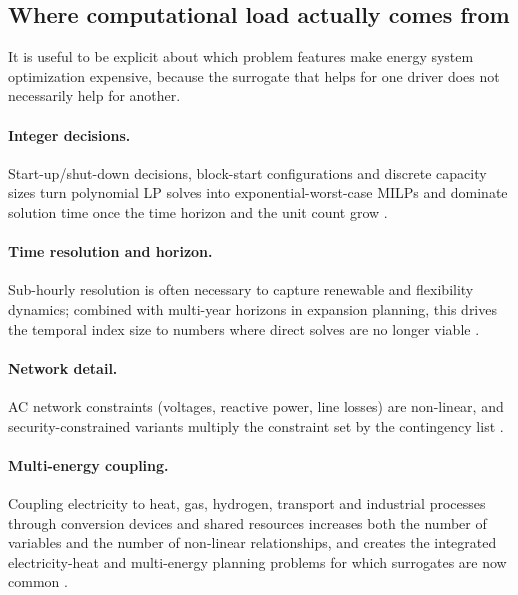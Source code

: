 
\subsection{Where computational load actually comes from}
\label{sec:background:cost-drivers}

It is useful to be explicit about which problem features make energy
system optimization expensive, because the surrogate that helps for
one driver does not necessarily help for another.

\paragraph{Integer decisions.}
Start-up/shut-down decisions, block-start configurations and discrete
capacity sizes turn polynomial LP solves into exponential-worst-case
MILPs and dominate solution time once the time horizon and the unit
count grow
\cite{Wu2022231,Chen20244723,Chen2022,Pang2023,Lin2023,Lu20232989,Wang20211767}.

\paragraph{Time resolution and horizon.}
Sub-hourly resolution is often necessary to capture renewable and
flexibility dynamics; combined with multi-year horizons in
expansion planning, this drives the temporal index size to numbers
where direct solves are no longer viable
\cite{Han2018622,Fu20202904,Fu2022,Rodgers2018951,Jahangiri20244849,Jahangiri2023,Hu2021671,Volodina2022,Schulte2016104}.

\paragraph{Network detail.}
AC network constraints (voltages, reactive power, line losses) are
non-linear, and security-constrained variants multiply the
constraint set by the contingency list
\cite{Muhlpfordt20194806,Su2022315,Deng2020831,Liu20223726,Urgun20202791,Chen2023657,Koirala20242284,Xu20212696,Khaloie2025}.

\paragraph{Multi-energy coupling.}
Coupling electricity to heat, gas, hydrogen, transport and industrial
processes through conversion devices and shared resources increases
both the number of variables and the number of non-linear
relationships, and creates the integrated electricity-heat and
multi-energy planning problems for which surrogates are now common
\cite{Zhou20181,Wang2021,Zheng20231907,Ren2024,Jalving2023,Dong2023,Yin2024,Cao2023,Wang2020202933,Roth2019214}.

